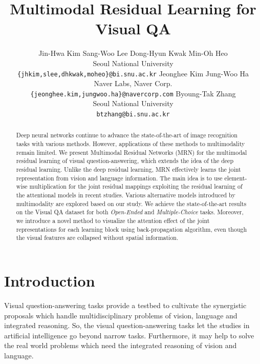 \documentclass{article}
\title{Multimodal Residual Learning for Visual QA}
\author{Jin-Hwa Kim\hspace{1em}
Sang-Woo Lee\hspace{1em}
Dong-Hyun Kwak\hspace{1em}
Min-Oh Heo
\\Seoul National University\\\texttt{\{jhkim,slee,dhkwak,moheo\}@bi.snu.ac.kr}
\And
Jeonghee Kim\hspace{2em}
Jung-Woo Ha
\\Naver Labs, Naver Corp.\\\texttt{\{jeonghee.kim,jungwoo.ha\}@navercorp.com}
\And
Byoung-Tak Zhang\\Seoul National University\\\texttt{btzhang@bi.snu.ac.kr}}
\begin{document}

\maketitle

\begin{abstract}
  Deep neural networks continue to advance the state-of-the-art of image recognition tasks with various methods. However, applications of these methods to multimodality remain limited. We present Multimodal Residual Networks (MRN) for the multimodal residual learning of visual question-answering, which extends the idea of the deep residual learning. Unlike the deep residual learning, MRN effectively learns the joint representation from vision and language information. The main idea is to use element-wise multiplication for the joint residual mappings exploiting the residual learning of the attentional models in recent studies. Various alternative models introduced by multimodality are explored based on our study. We achieve the state-of-the-art results on the Visual QA dataset for both \textit{Open-Ended} and \textit{Multiple-Choice} tasks. Moreover, we introduce a novel method to visualize the attention effect of the joint representations for each learning block using back-propagation algorithm, even though the visual features are collapsed without spatial information.
\end{abstract}

\section{Introduction}

  
Visual question-answering tasks provide a testbed to cultivate the synergistic proposals which handle multidisciplinary problems of vision, language and integrated reasoning. So, the visual question-answering tasks let the studies in artificial intelligence go beyond narrow tasks. Furthermore, it may help to solve the real world problems which need the integrated reasoning of vision and language.
\end{document}
